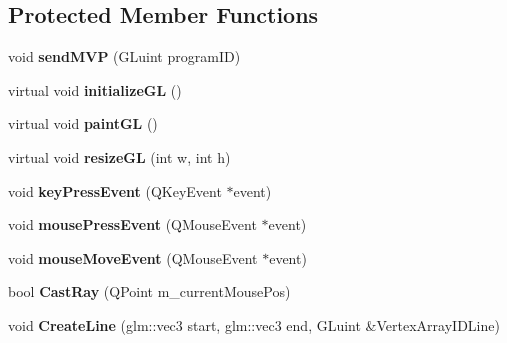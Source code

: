\subsection*{Protected Member Functions}
\begin{DoxyCompactItemize}
\item 
\hypertarget{classGameView3D_ae077404d42f477162b3540da397a8ad4}{void {\bfseries send\-M\-V\-P} (G\-Luint program\-I\-D)}\label{classGameView3D_ae077404d42f477162b3540da397a8ad4}

\item 
\hypertarget{classGameView3D_a9a9ed01ef943bd24cbf41cb7de1993cc}{virtual void {\bfseries initialize\-G\-L} ()}\label{classGameView3D_a9a9ed01ef943bd24cbf41cb7de1993cc}

\item 
\hypertarget{classGameView3D_aa3422302bf8c9e9b30da86a916aec0aa}{virtual void {\bfseries paint\-G\-L} ()}\label{classGameView3D_aa3422302bf8c9e9b30da86a916aec0aa}

\item 
\hypertarget{classGameView3D_ac8cde08a41504dce4e95f08158bae4e2}{virtual void {\bfseries resize\-G\-L} (int w, int h)}\label{classGameView3D_ac8cde08a41504dce4e95f08158bae4e2}

\item 
\hypertarget{classGameView3D_abeb74e91cd820d7af1e62c714fc1864f}{void {\bfseries key\-Press\-Event} (Q\-Key\-Event $\ast$event)}\label{classGameView3D_abeb74e91cd820d7af1e62c714fc1864f}

\item 
\hypertarget{classGameView3D_a2a66712712d355039299efb5513fbeb2}{void {\bfseries mouse\-Press\-Event} (Q\-Mouse\-Event $\ast$event)}\label{classGameView3D_a2a66712712d355039299efb5513fbeb2}

\item 
\hypertarget{classGameView3D_a16eb2fd0448d2f50b1c5287f86ac9437}{void {\bfseries mouse\-Move\-Event} (Q\-Mouse\-Event $\ast$event)}\label{classGameView3D_a16eb2fd0448d2f50b1c5287f86ac9437}

\item 
\hypertarget{classGameView3D_aa4d6e119510fc03c95d52282579ca8ed}{bool {\bfseries Cast\-Ray} (Q\-Point m\-\_\-current\-Mouse\-Pos)}\label{classGameView3D_aa4d6e119510fc03c95d52282579ca8ed}

\item 
\hypertarget{classGameView3D_a31d588b55fd79e52732a28ccd196733c}{void {\bfseries Create\-Line} (glm\-::vec3 start, glm\-::vec3 end, G\-Luint \&Vertex\-Array\-I\-D\-Line)}\label{classGameView3D_a31d588b55fd79e52732a28ccd196733c}


\end{DoxyCompactItemize}

